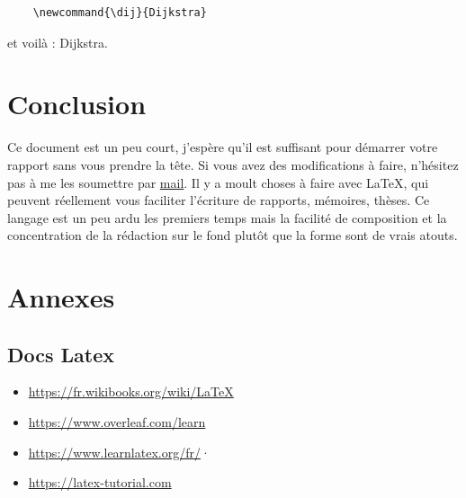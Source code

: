 \documentclass{rapportAlgoM1}
\begin{document}
\begin{verbatim}
	\newcommand{\dij}{Dijkstra}
\end{verbatim}
\newcommand{\dij}{Dijkstra} %
et voilà : \dij.

\section{Conclusion}
Ce document est un peu court, j'espère qu'il est suffisant pour démarrer votre rapport sans vous prendre la tête. Si vous avez des modifications à faire, n'hésitez pas à me les soumettre par \href{mailto:romain.raffin@u-bourgogne.fr}{mail}. Il y a moult choses à faire avec \LaTeX{}, qui peuvent réellement vous faciliter l'écriture de rapports, mémoires, thèses. Ce langage est un peu ardu les premiers temps mais la facilité de composition et la concentration de la rédaction sur le fond plutôt que la forme sont de vrais atouts.

\section*{Annexes}
\subsection{Docs Latex}\label{sec:doclatex}
\begin{itemize}
	\item \url{https://fr.wikibooks.org/wiki/LaTeX}
	\item \url{https://www.overleaf.com/learn}
	\item \url{https://www.learnlatex.org/fr/}·
	\item \url{https://latex-tutorial.com}
\end{itemize}

\end{document}
